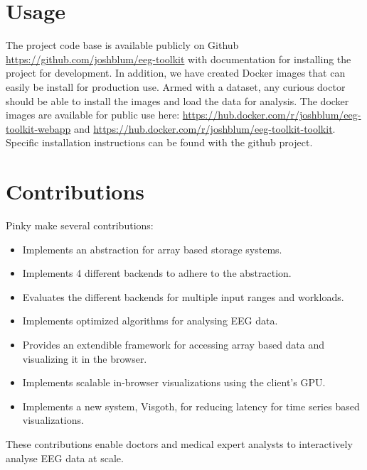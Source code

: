 \section{Usage}

The project code base is available publicly on Github \cite{github}
\url{https://github.com/joshblum/eeg-toolkit} with documentation for installing
the project for development. In addition, we have created Docker \cite{docker}
images that can easily be install for production use. Armed with a dataset, any
curious doctor should be able to install the images and load the data for
analysis. The docker images are available for public use here:
\url{https://hub.docker.com/r/joshblum/eeg-toolkit-webapp} and
\url{https://hub.docker.com/r/joshblum/eeg-toolkit-toolkit}. Specific
installation instructions can be found with the github project.

\section{Contributions}

Pinky make several contributions:

\begin{itemize}
  \item Implements an abstraction for array based storage systems.
  \item Implements 4 different backends to adhere to the abstraction.
  \item Evaluates the different backends for multiple input ranges and workloads.
  \item Implements optimized algorithms for analysing EEG data.
  \item Provides an extendible framework for accessing array based data and visualizing it in the browser.
  \item Implements scalable in-browser visualizations using the client's GPU.
  \item Implements a new system, Visgoth, for reducing latency for time series based visualizations.
\end{itemize}

These contributions enable doctors and medical expert analysts to interactively
analyse EEG data at scale.

